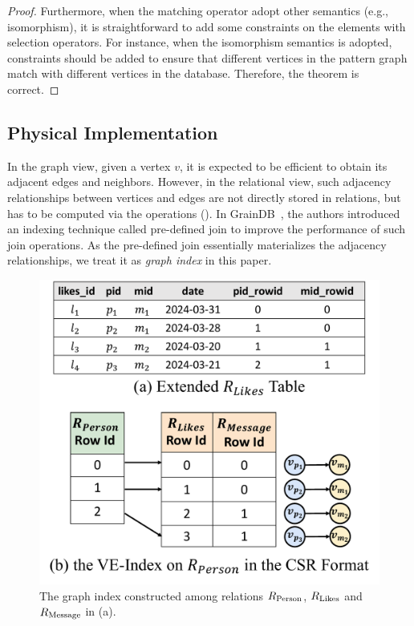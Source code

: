 \begin{proof}
    Furthermore, when the matching operator adopt other semantics (e.g., isomorphism), it is straightforward to add some constraints on the elements with selection operators.
    For instance, when the isomorphism semantics is adopted, constraints should be added to ensure that different vertices in the pattern graph match with different vertices in the database.
    Therefore, the theorem is correct.
\end{proof}
\fi


\subsection{Physical Implementation}
\label{sec:physical-operators}

In the graph view, given a vertex $v$, it is expected to be efficient to obtain its adjacent edges and neighbors. However, in the relational view, such adjacency relationships between vertices and edges are not directly stored in relations, but has to be computed via the \EVjoin operations (). In GrainDB~\cite{graindb}, the authors introduced an indexing technique called pre-defined join to improve the performance of such join operations. As the pre-defined join essentially materializes the adjacency relationships, we treat it as \emph{graph index} in this paper.

\begin{figure}
    \centering
    \includegraphics[width=.8\linewidth]{./figures/graph-index-likes.pdf}
    \caption{The graph index constructed among relations ${R_{\text{Person}}}$, ${R_{\text{Likes}}}$
    and ${R_{\text{Message}}}$ in (a).}
    \label{fig:graph-index}
\end{figure}

